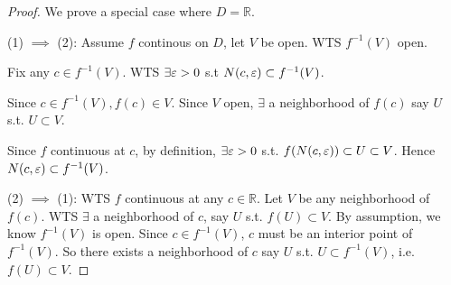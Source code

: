\begin{proof}
    We prove a special case where $D = \mathbb{R}$.
    \medskip

    (1) $\implies$ (2): Assume $f$ continous on $D$, let $V$ be open. WTS $f^{-1}(V)$
    open. 
    \medskip

    Fix any $c \in f^{-1}(V)$. WTS $\exists \varepsilon > 0$  s.t $N(c, \varepsilon) \subset f^{-1}(V)$.
    \medskip

    Since $c \in f^{-1}(V), f(c) \in V$. Since $V$ open, $\exists$ a neighborhood
    of $f(c)$ say $U$ s.t. $U \subset V$.
    \medskip
    
    Since $f$ continuous at $c$, by definition, $\exists \varepsilon > 0$  s.t. 
    $f(N(c, \varepsilon)) \subset U \subset V$. Hence $N(c, \varepsilon) \subset f^{-1}(V)$.
    \medskip

    (2) $\implies$ (1): WTS $f$ continuous at any $c \in \mathbb{R}$. Let $V$ 
    be any neighborhood of $f(c)$. WTS $\exists$ a neighborhood of $c$, say $U$ s.t.
    $f(U) \subset V$. 
    By assumption, we know $f^{-1}(V)$ is open. Since $c \in f^{-1}(V)$, 
    $c$ must be an interior point of $f^{-1}(V)$. So there exists a neighborhood 
    of $c$ say $U$ s.t. $U\subset f^{-1}(V)$, i.e. $f(U) \subset V$.
\end{proof}













